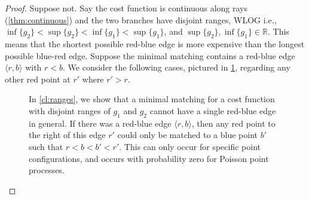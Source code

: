 \documentclass{article}
\newcommand{\R}{\mathbb{R}}
\begin{document}
\begin{proof}
    Suppose not. Say the cost function is continuous along rays
    (\cref{thm:continuous}) and the two branches have disjoint ranges, WLOG
    i.e.,
    $\inf\{g_2\}<\sup\{g_2\}<\inf\{g_1\}<\sup\{g_1\}$, and
    $\sup\{g_2\},\inf\{g_1\}\in\R$. This means that the shortest
    possible red-blue edge is more expensive than the longest possible
    blue-red edge. Suppose the minimal matching contains a red-blue
    edge $\langle r,b \rangle$ with $r<b$. We consider the following
    cases, pictured in \cref{fig:ranges2},
    regarding any other red point at $r'$ where $r'>r$.


    \begin{figure}[h]
      \centering
      \caption{In \cref{cl:ranges}, we show that a minimal matching
        for a cost function with disjoint ranges of $g_1$ and $g_2$
        cannot have a single red-blue edge in general. If there was a
        red-blue edge $\langle r,b \rangle$, then any red point to the
        right of this edge $r'$ could only be matched to a blue point
        $b'$ such that $r<b<b'<r'$. This can only occur for specific
        point configurations, and occurs with probability zero for
        Poisson point processes.   }
      \label{fig:ranges2}
    \end{figure}


\end{proof}
\end{document}
